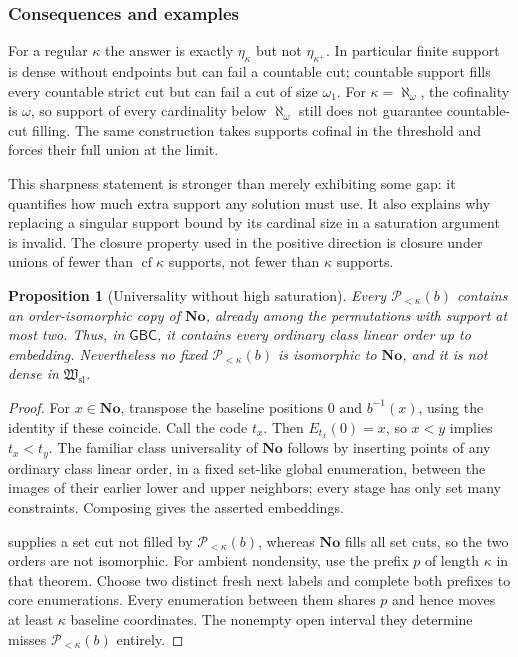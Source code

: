 \documentclass[11pt]{article}
\newtheorem{proposition}[proposition]{Proposition}
\theoremstyle{definition}
\theoremstyle{remark}
\newcommand{\No}{\mathbf{No}}
\newcommand{\Hsl}{\mathfrak W_{\mathrm{sl}}}
\newcommand{\cf}{\operatorname{cf}}
\newcommand{\GBC}{\mathsf{GBC}}
\begin{document}
\subsubsection{Consequences and examples}
For a regular $\kappa$ the answer is exactly $\eta_\kappa$ but not
$\eta_{\kappa^+}$. In particular finite support is dense without
endpoints but can fail a countable cut; countable support fills every
countable strict cut but can fail a cut of size $\omega_1$.
For $\kappa=\aleph_\omega$, the cofinality is $\omega$, so support
of every cardinality below $\aleph_\omega$ still does not guarantee
countable-cut filling. The same construction takes supports cofinal
in the threshold and forces their full union at the limit.

This sharpness statement is stronger than merely exhibiting some gap:
it quantifies how much extra support any solution must use. It also
explains why replacing a singular support bound by its cardinal size
in a saturation argument is invalid. The closure property used in the
positive direction is closure under unions of fewer than
$\cf\kappa$ supports, not fewer than $\kappa$ supports.

\begin{proposition}[Universality without high saturation]
\label{swo:tc:prop:supportuniversal}
Every $\mathcal P_{<\kappa}(b)$ contains an order-isomorphic copy of $\No$, already among
the permutations with support at most two. Thus, in $\GBC$, it contains
every ordinary class linear order up to embedding. Nevertheless no fixed
$\mathcal P_{<\kappa}(b)$ is isomorphic to $\No$, and it is not dense in $\Hsl$.
\end{proposition}
\begin{proof}
For $x\in\No$, transpose the baseline positions $0$ and $b^{-1}(x)$,
using the identity if these coincide. Call the code $t_x$. Then
$E_{t_x}(0)=x$, so $x<y$ implies $t_x<t_y$. The familiar class
universality of $\No$ follows by inserting points of any ordinary
class linear order, in a fixed set-like global enumeration, between the
images of their earlier lower and upper neighbors; every stage has
only set many constraints. Composing gives the asserted embeddings.

 supplies a set cut not filled by $\mathcal P_{<\kappa}(b)$,
whereas $\No$ fills all set cuts, so the two orders are not isomorphic.
For ambient nondensity, use the prefix $p$ of length $\kappa$ in that
theorem. Choose two distinct fresh next labels and complete both
prefixes to core enumerations. Every enumeration between them shares
$p$ and hence moves at least $\kappa$ baseline coordinates. The
nonempty open interval they determine misses $\mathcal P_{<\kappa}(b)$ entirely.
\end{proof}
\end{document}
